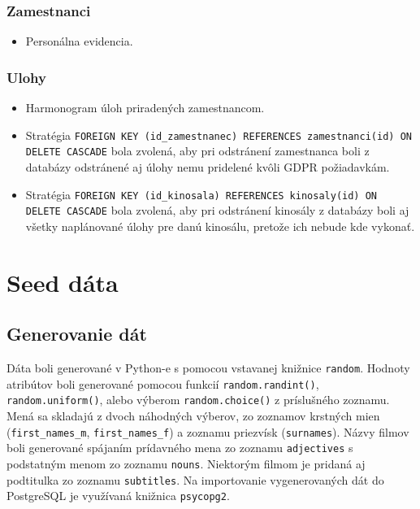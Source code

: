 \documentclass[11pt, a4paper]{article}
\begin{document}
\subsubsection{Zamestnanci}
\begin{itemize}
    \item Personálna evidencia.
\end{itemize}

\subsubsection{Ulohy}
\begin{itemize}
    \item Harmonogram úloh priradených zamestnancom.
    \item Stratégia \texttt{FOREIGN KEY (id\_zamestnanec) REFERENCES zamestnanci(id) ON DELETE CASCADE} bola zvolená, aby pri odstránení zamestnanca boli z databázy odstránené aj úlohy nemu pridelené kvôli GDPR požiadavkám. 
    \item Stratégia \texttt{FOREIGN KEY (id\_kinosala) REFERENCES kinosaly(id) ON DELETE CASCADE} bola zvolená, aby pri odstránení kinosály z databázy boli aj všetky naplánované úlohy pre danú kinosálu, pretože ich nebude kde vykonať.
\end{itemize}

\newpage

\section{Seed dáta}
\label{sec:seed}
\subsection{Generovanie dát}
Dáta boli generované v Python-e s pomocou vstavanej knižnice \texttt{random}. Hodnoty atribútov boli generované pomocou funkcií \texttt{random.randint()}, \texttt{random.uniform()}, alebo výberom \texttt{random.choice()} z príslušného zoznamu. Mená sa skladajú z dvoch náhodných výberov, zo zoznamov krstných mien (\texttt{first\_names\_m}, \texttt{first\_names\_f}) a zoznamu priezvísk (\texttt{surnames}). Názvy filmov boli generované spájaním prídavného mena zo zoznamu \texttt{adjectives} s podstatným menom zo zoznamu \texttt{nouns}. Niektorým filmom je pridaná aj podtitulka zo zoznamu \texttt{subtitles}. Na importovanie vygenerovaných dát do PostgreSQL je využívaná knižnica \texttt{psycopg2}.
\end{document}
